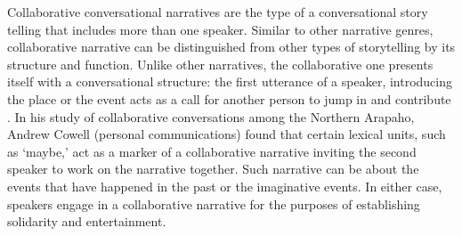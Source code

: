 \documentclass[12pt]{article}
\begin{document}
Collaborative conversational narratives are the type of a conversational story telling that includes more than one speaker. Similar to other narrative genres, collaborative narrative can be distinguished from other types of storytelling by its structure and function. Unlike other narratives, the collaborative one presents itself with a conversational structure: the first utterance of a speaker, introducing the place or the event acts as a call for another person to jump in and contribute \parencite{norrick2000}. In his study of collaborative conversations among the Northern Arapaho, Andrew Cowell (personal communications) found that certain lexical units, such as `maybe,' act as a marker of a collaborative narrative inviting the second speaker to work on the narrative together. Such narrative can be about the events that have happened in the past or the imaginative events. In either case, speakers engage in a collaborative narrative for the purposes of establishing solidarity and entertainment. 
\end{document}
